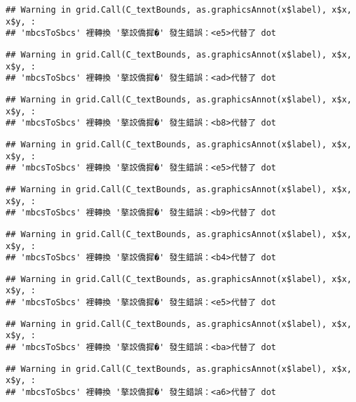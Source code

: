 \documentclass[
]{article}
\begin{document}
\begin{verbatim}
## Warning in grid.Call(C_textBounds, as.graphicsAnnot(x$label), x$x, x$y, :
## 'mbcsToSbcs' 裡轉換 '摮詨僑摨�' 發生錯誤：<e5>代替了 dot
\end{verbatim}

\begin{verbatim}
## Warning in grid.Call(C_textBounds, as.graphicsAnnot(x$label), x$x, x$y, :
## 'mbcsToSbcs' 裡轉換 '摮詨僑摨�' 發生錯誤：<ad>代替了 dot
\end{verbatim}

\begin{verbatim}
## Warning in grid.Call(C_textBounds, as.graphicsAnnot(x$label), x$x, x$y, :
## 'mbcsToSbcs' 裡轉換 '摮詨僑摨�' 發生錯誤：<b8>代替了 dot
\end{verbatim}

\begin{verbatim}
## Warning in grid.Call(C_textBounds, as.graphicsAnnot(x$label), x$x, x$y, :
## 'mbcsToSbcs' 裡轉換 '摮詨僑摨�' 發生錯誤：<e5>代替了 dot
\end{verbatim}

\begin{verbatim}
## Warning in grid.Call(C_textBounds, as.graphicsAnnot(x$label), x$x, x$y, :
## 'mbcsToSbcs' 裡轉換 '摮詨僑摨�' 發生錯誤：<b9>代替了 dot
\end{verbatim}

\begin{verbatim}
## Warning in grid.Call(C_textBounds, as.graphicsAnnot(x$label), x$x, x$y, :
## 'mbcsToSbcs' 裡轉換 '摮詨僑摨�' 發生錯誤：<b4>代替了 dot
\end{verbatim}

\begin{verbatim}
## Warning in grid.Call(C_textBounds, as.graphicsAnnot(x$label), x$x, x$y, :
## 'mbcsToSbcs' 裡轉換 '摮詨僑摨�' 發生錯誤：<e5>代替了 dot
\end{verbatim}

\begin{verbatim}
## Warning in grid.Call(C_textBounds, as.graphicsAnnot(x$label), x$x, x$y, :
## 'mbcsToSbcs' 裡轉換 '摮詨僑摨�' 發生錯誤：<ba>代替了 dot
\end{verbatim}

\begin{verbatim}
## Warning in grid.Call(C_textBounds, as.graphicsAnnot(x$label), x$x, x$y, :
## 'mbcsToSbcs' 裡轉換 '摮詨僑摨�' 發生錯誤：<a6>代替了 dot
\end{verbatim}
\end{document}
